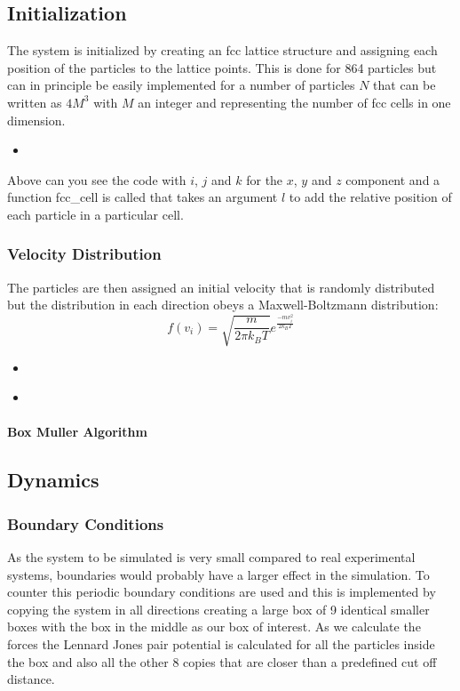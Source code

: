 \documentclass[
10pt, %
a4paper, %
oneside, %
headinclude,footinclude, %
BCOR5mm, %
]{scrartcl}
\newcommand{\insertcode}[2]{\begin{itemize}\item[]\end{itemize}} %
\begin{document}
\subsection{Initialization}

The system is initialized by creating an fcc lattice structure and assigning each position of the particles to the lattice points. This is done for 864 particles but can in principle be easily implemented for a number of particles $N$ that can be written as $4M^3$ with $M$ an integer and representing the number of fcc cells in one dimension.

\insertcode{"Scripts/initialization_snippet_1.f90"}{Constructing the fcc lattice} %

Above can you see the code with $i$, $j$ and $k$ for the $x$, $y$ and $z$ component and a function fcc\_cell is called that takes an argument $l$ to add the relative position of each particle in a particular cell.


\subsubsection{Velocity Distribution}

The particles are then assigned an initial velocity that is randomly distributed but the distribution in each direction obeys a Maxwell-Boltzmann distribution:
$$ f(v_i) = \sqrt{\frac{m}{2\pi k_B T}} e^{\frac{-mv_i^2}{2k_BT}} $$

\insertcode{"Scripts/initialization_snippet_2.f90"}{Generating initial velocities} %

\insertcode{"Scripts/initialization_snippet_3.f90"}{Removing the center of mass degree of freedom} %

\paragraph{Box Muller Algorithm}


\subsection{Dynamics}

\subsubsection{Boundary Conditions}
As the system to be simulated is very small compared to real experimental systems, boundaries would probably have a larger effect in the simulation. To counter this periodic boundary conditions are used and this is implemented by copying the system in all directions creating a large box of 9 identical smaller boxes with the box in the middle as our box of interest. As we calculate the forces the Lennard Jones pair potential is calculated for all the particles inside the box and also all the other 8 copies that are closer than a predefined cut off distance. 
\end{document}
